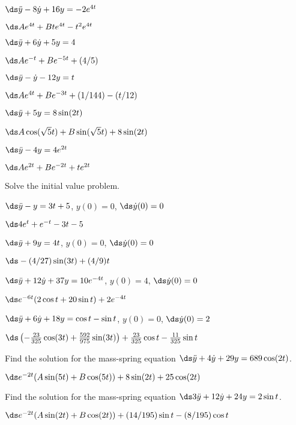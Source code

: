 \begin{exercises}
\exer $\ds\ddot y-8\dot y+16y=-2e^{4t}$
\begin{answer} $\ds Ae^{4t}+Bte^{4t}-t^2e^{4t}$
\end{answer}

\exer $\ds\ddot y+6\dot y+5y=4$
\begin{answer} $\ds Ae^{-t}+Be^{-5t}+(4/5)$
\end{answer}

\exer $\ds\ddot y-\dot y-12y=t$
\begin{answer} $\ds Ae^{4t}+Be^{-3t}+(1/144)-(t/12)$
\end{answer}

\exer $\ds\ddot y+5y=8\sin(2t)$
\begin{answer} $\ds A\cos(\sqrt5t)+B\sin(\sqrt5t)+8\sin(2t)$
\end{answer}

\exer $\ds\ddot y-4y=4e^{2t}$
\begin{answer} $\ds Ae^{2t}+Be^{-2t}+te^{2t}$
\end{answer}

Solve the initial value problem.

\exer $\ds\ddot y-y=3t+5$, $y(0)=0$, $\ds\dot y(0)=0$
\begin{answer} $\ds 4e^{t}+e^{-t}-3t-5$
\end{answer}

\exer $\ds\ddot y+9y=4t$, $y(0)=0$, $\ds\dot y(0)=0$
\begin{answer} $\ds -(4/27)\sin(3t)+(4/9)t$
\end{answer}

\exer $\ds\ddot y +12\dot y +37y=10e^{-4t}$, $y(0)=4$, $\ds\dot y(0)=0$
\begin{answer} $\ds e^{-6t}(2\cos t+20\sin t)+2e^{-4t}$
\end{answer}

\exer $\ds\ddot y+6\dot y+18y=\cos t-\sin t$, $y(0)=0$, $\ds\dot
y(0)=2$ 
\begin{answer} $\ds
\left(-{23\over 325}\cos(3t)+{592\over 975}\sin(3t)\right)+
{23\over325}\cos t-{11\over325}\sin t$
\end{answer}

\exer Find the solution for the mass-spring equation
$\ds\ddot y+4\dot y+29y=689\cos(2t)$.
\begin{answer} $\ds e^{-2t}(A\sin(5t)+B\cos(5t))+8\sin(2t)+25\cos(2t)$
\end{answer}

\exer Find the solution for the mass-spring equation
$\ds3\ddot y+12\dot y+24y=2\sin t$.
\begin{answer} $\ds e^{-2t}(A\sin(2t)+B\cos(2t))+(14/195)\sin t-(8/195)\cos t$
\end{answer}


\end{exercises}
